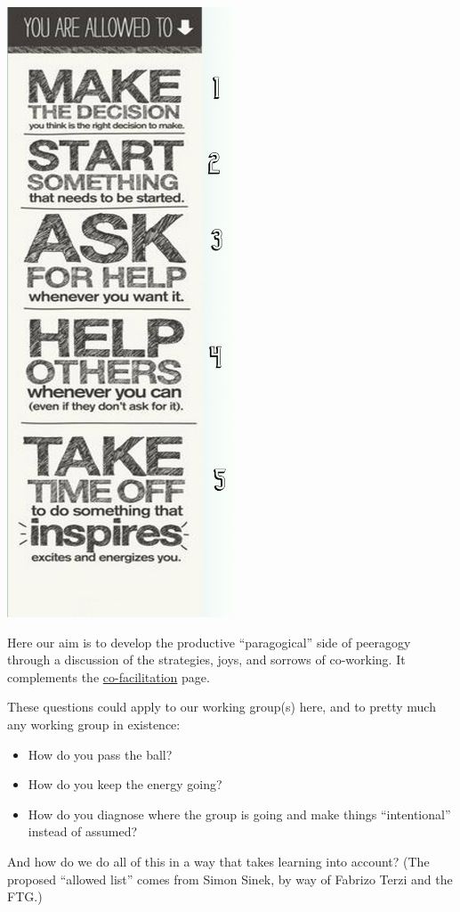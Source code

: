 \begin{table}
\vspace{-25pt}
\begin{center}
\includegraphics[width=.35\textwidth]{../pictures/allowed-list.jpg}
\end{center}
\vspace{-70pt}
\end{table}

Here our aim is to develop the productive ``paragogical'' side of
peeragogy through a discussion of the strategies, joys, and sorrows of
co-working. It complements the
\href{http://socialmediaclassroom.com/host/peeragogy/freelinking/Co-Working}{co-facilitation}
page.


These questions could apply to our working group(s) here, and to pretty
much any working group in existence:

\begin{itemize}
\item
  How do you pass the ball?
\item
  How do you keep the energy going?
\item
  How do you diagnose where the group is going and make things
  ``intentional'' instead of assumed?
\end{itemize}
And how do we do all of this in a way that takes learning into account?
(The proposed ``allowed list'' comes from Simon Sinek, by way of Fabrizo
Terzi and the FTG.)

